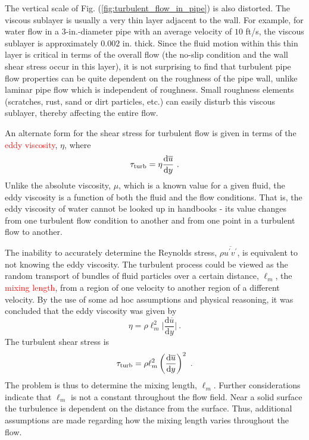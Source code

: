 \documentclass[12pt,a4paper]{article}
\newcommand{\dif}{\mathrm{d}}
\begin{document}
The vertical scale of Fig. (\ref{fig:turbulent_flow_in_pipe}) is also distorted. The viscous sublayer is usually a very thin layer adjacent to the wall. For example, for water flow in a $3$-in.-diameter pipe with an average velocity of $10$ ft/s, the viscous sublayer is approximately $0.002$ in. thick. Since the fluid motion within this thin layer is critical in terms of the overall flow (the no-slip condition and the wall shear stress occur in this layer), it is not surprising to find that turbulent pipe flow properties can be quite dependent on the roughness of the pipe wall, unlike laminar pipe flow which is independent of roughness. Small roughness elements (scratches, rust, sand or dirt particles, etc.) can easily disturb this viscous sublayer, thereby affecting the entire flow.

An alternate form for the shear stress for turbulent flow is given in terms of the \textcolor{red}{eddy viscosity}, $\eta$, where
\begin{equation}
\tau_{\rm turb} = \eta \dfrac{\dif \overline{u}}{\dif y} ~.
\end{equation}
Unlike the absolute viscosity, $\mu$, which is a known value for a given fluid, the eddy viscosity is a function of both the fluid and the flow conditions. That is, the eddy viscosity of water cannot be looked up in handbooks - its value changes from one turbulent flow condition to another and from one point in a turbulent flow to another.

The inability to accurately determine the Reynolds stress, $\rho \overline{u^\prime v^\prime}$, is equivalent to not knowing the eddy viscosity. The turbulent process could be viewed as the random transport of bundles of fluid particles over a certain distance, $\ell_m$, the \textcolor{red}{mixing length}, from a region of one velocity to another region of a different velocity. By the use of some ad hoc assumptions and physical reasoning, it was concluded that the eddy viscosity was given by
\begin{equation}
\eta = \rho \ell_m^2 \Bigg|  \dfrac{\dif \overline{u}}{\dif y}  \Bigg| ~.
\end{equation}
The turbulent shear stress is
\begin{equation}
\tau_{\rm turb} = \rho \ell_m^2 \left(\dfrac{\dif \overline{u}}{\dif y}  \right)^2 ~.
\end{equation}
The problem is thus to determine the mixing length, $\ell_m$. Further considerations indicate that $\ell_m$ is not a constant throughout the flow field. Near a solid surface the turbulence is dependent on the distance from the surface. Thus, additional assumptions are made regarding how the mixing length varies throughout the flow.
\end{document}
